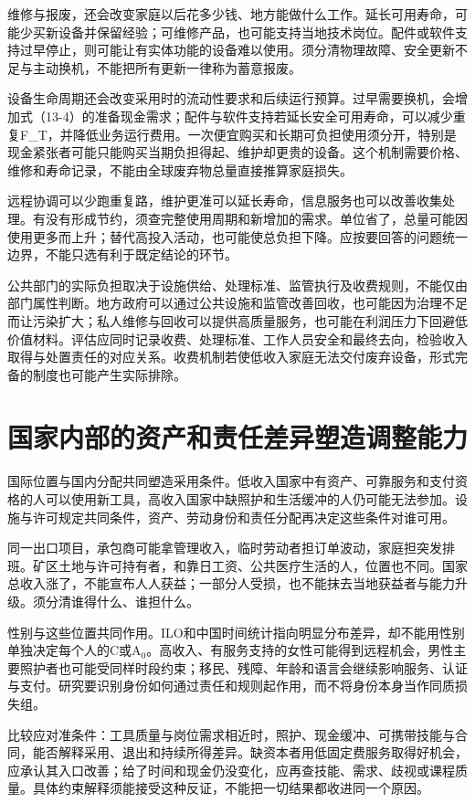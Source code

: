 \documentclass[UTF8,fontset=windows,12pt,a4paper,oneside,openany]{ctexbook}
\begin{document}
维修与报废，还会改变家庭以后花多少钱、地方能做什么工作。延长可用寿命，可能少买新设备并保留经验；可维修产品，也可能支持当地技术岗位。配件或软件支持过早停止，则可能让有实体功能的设备难以使用。须分清物理故障、安全更新不足与主动换机，不能把所有更新一律称为蓄意报废。

设备生命周期还会改变采用时的流动性要求和后续运行预算。过早需要换机，会增加式（13-4）的准备现金需求；配件与软件支持若延长安全可用寿命，可以减少重复F\_T，并降低业务运行费用。一次便宜购买和长期可负担使用须分开，特别是现金紧张者可能只能购买当期负担得起、维护却更贵的设备。这个机制需要价格、维修和寿命记录，不能由全球废弃物总量直接推算家庭损失。

远程协调可以少跑重复路，维护更准可以延长寿命，信息服务也可以改善收集处理。有没有形成节约，须查完整使用周期和新增加的需求。单位省了，总量可能因使用更多而上升；替代高投入活动，也可能使总负担下降。应按要回答的问题统一边界，不能只选有利于既定结论的环节。

公共部门的实际负担取决于设施供给、处理标准、监管执行及收费规则，不能仅由部门属性判断。地方政府可以通过公共设施和监管改善回收，也可能因为治理不足而让污染扩大；私人维修与回收可以提供高质量服务，也可能在利润压力下回避低价值材料。评估应同时记录收费、处理标准、工作人员安全和最终去向，检验收入取得与处置责任的对应关系。收费机制若使低收入家庭无法交付废弃设备，形式完备的制度也可能产生实际排除。

\section{国家内部的资产和责任差异塑造调整能力}

国际位置与国内分配共同塑造采用条件。低收入国家中有资产、可靠服务和支付资格的人可以使用新工具，高收入国家中缺照护和生活缓冲的人仍可能无法参加。设施与许可规定共同条件，资产、劳动身份和责任分配再决定这些条件对谁可用。

同一出口项目，承包商可能拿管理收入，临时劳动者担订单波动，家庭担突发排班。矿区土地与许可持有者，和靠日工资、公共医疗生活的人，位置也不同。国家总收入涨了，不能宣布人人获益；一部分人受损，也不能抹去当地获益者与能力升级。须分清谁得什么、谁担什么。

性别与这些位置共同作用。ILO和中国时间统计指向明显分布差异，却不能用性别单独决定每个人的C或A\ensuremath{_0}。高收入、有服务支持的女性可能得到远程机会，男性主要照护者也可能受同样时段约束；移民、残障、年龄和语言会继续影响服务、认证与支付。研究要识别身份如何通过责任和规则起作用，而不将身份本身当作同质损失组。

比较应对准条件：工具质量与岗位需求相近时，照护、现金缓冲、可携带技能与合同，能否解释采用、退出和持续所得差异。缺资本者用低固定费服务取得好机会，应承认其入口改善；给了时间和现金仍没变化，应再查技能、需求、歧视或课程质量。具体约束解释须能接受这种反证，不能把一切结果都收进同一个原因。
\end{document}
